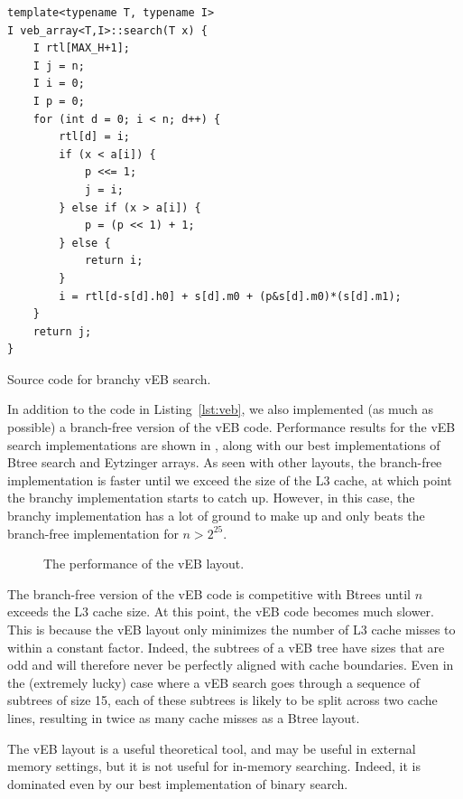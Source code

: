 \documentclass{patmorin}
\newcommand{\lstlabel}[1]{\label{lst:#1}}
\newcommand{\lstref}[1]{Listing~\ref{lst:#1}}
\begin{document}
\begin{listing}
\begin{verbatim}
template<typename T, typename I>
I veb_array<T,I>::search(T x) {
    I rtl[MAX_H+1];
    I j = n;
    I i = 0;
    I p = 0;
    for (int d = 0; i < n; d++) {
        rtl[d] = i;
        if (x < a[i]) {
            p <<= 1;
            j = i;
        } else if (x > a[i]) {
            p = (p << 1) + 1;
        } else {
            return i;
        }
        i = rtl[d-s[d].h0] + s[d].m0 + (p&s[d].m0)*(s[d].m1);
    }
    return j;
}
\end{verbatim}
\caption{Source code for branchy vEB search.}
\lstlabel{veb}
\end{listing}

In addition to the code in \lstref{veb}, we also implemented (as much as
possible) a branch-free version of the vEB code.  Performance results for
the vEB search implementations are shown in , along with our
best implementations of Btree search and Eytzinger arrays.  As seen with other
layouts, the branch-free implementation is faster until we exceed the size
of the L3 cache, at which point the branchy implementation starts to catch
up. However, in this case, the branchy implementation has a lot of ground
to make up and only beats the branch-free implementation for $n>2^{25}$.

\begin{figure}
   \caption{The performance of the vEB layout.}
\end{figure}

The branch-free version of the vEB code is competitive with Btrees
until $n$ exceeds the L3 cache size.  At this point, the vEB code becomes
much slower.  This is because the vEB layout only minimizes the number
of L3 cache misses to within a constant factor.  Indeed, the subtrees
of a vEB tree have sizes that are odd and will therefore never be
perfectly aligned with cache boundaries.  Even in the (extremely lucky)
case where a vEB search goes through a sequence of subtrees of size 15,
each of these subtrees is likely to be split across two cache lines,
resulting in twice as many cache misses as a Btree layout.

\begin{lesson}
  The vEB layout is a useful theoretical tool, and may be useful in
  external memory settings, but it is not useful for in-memory searching.
  Indeed, it is dominated even by our best implementation of binary
  search.
\end{lesson}
\end{document}
